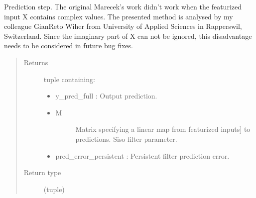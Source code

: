 \documentclass[letterpaper,10pt,english]{sphinxmanual}
\begin{document}
\begin{fulllineitems}
\begin{fulllineitems}
\label{\detokenize{LDS.LDS.filters:LDS.LDS.filters.wave_filtering_siso_ftl.WaveFilteringSisoFtl.predict}}
\sphinxAtStartPar
Prediction step. The original Marecek’s work didn’t work when the featurized input X
contains complex values. The presented method is analysed by my colleague Gian\sphinxhyphen{}Reto Wiher
from University of Applied Sciences in Rapperswil, Switzerland. Since the imaginary part
of X can not be ignored, this disadvantage needs to be considered in future bug fixes.
\begin{quote}\begin{description}
\item[{Returns}] \leavevmode
\sphinxAtStartPar

\sphinxAtStartPar
tuple containing:
\begin{itemize}
\item {} 
\sphinxAtStartPar
y\_pred\_full           : Output prediction.

\item {} \begin{description}
\item[{M}] \leavevmode{[}Matrix specifying a linear map from featurized inputs{]}
\sphinxAtStartPar
to predictions. Siso filter parameter.

\end{description}

\item {} 
\sphinxAtStartPar
pred\_error\_persistent : Persistent filter prediction error.

\end{itemize}


\item[{Return type}] \leavevmode
\sphinxAtStartPar
(tuple)

\end{description}\end{quote}

\end{fulllineitems}


\end{fulllineitems}
\end{document}

